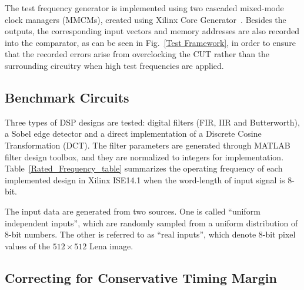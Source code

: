 \documentclass[prodmode,acmtrets]{acmsmall} %
\begin{document}
The test frequency generator is implemented using two cascaded mixed-mode clock managers (MMCMs), created using Xilinx Core Generator~\cite{Virtex6Clocking}. Besides the outputs, the corresponding input vectors and memory addresses are also recorded into the comparator, as can be seen in Fig.~\ref{Test Framework}, in order to ensure that the recorded errors arise from overclocking the CUT rather than the surrounding circuitry when high test frequencies are applied.

\subsection{Benchmark Circuits}
Three types of DSP designs are tested: digital filters (FIR, IIR and Butterworth), a Sobel edge detector and a direct implementation of a Discrete Cosine Transformation (DCT). The filter parameters are generated through MATLAB filter design toolbox, and they are normalized to integers for implementation. Table~\ref{Rated_Frequency_table} summarizes the operating frequency of each implemented design in Xilinx ISE14.1 when the word-length of input signal is 8-bit.

\begin{table}%
\end{table}%

The input data are generated from two sources. One is called ``uniform independent inputs'', which are randomly sampled from a uniform distribution of 8-bit numbers. The other is referred to as ``real inputs'', which denote 8-bit pixel values of the $512\! \times\! 512$ Lena image.

\subsection{Correcting for Conservative Timing Margin} %
\label{sub:exploring_the_conservative_timing_margin}
\end{document}

